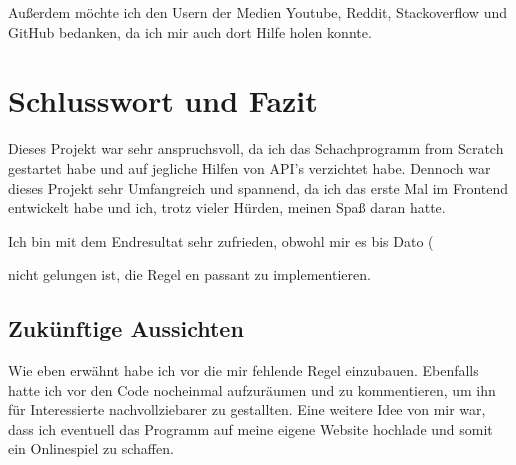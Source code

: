 \documentclass[a4paper, 10pt]{scrartcl}
\begin{document}
Außerdem möchte ich den Usern der Medien Youtube, Reddit, Stackoverflow und GitHub bedanken,
da ich mir auch dort Hilfe holen konnte. 

\section{Schlusswort und Fazit}
Dieses Projekt war sehr anspruchsvoll, da ich das Schachprogramm \glqq from Scratch\grqq{}
gestartet habe und auf jegliche Hilfen von API's verzichtet habe. Dennoch war dieses Projekt
sehr Umfangreich und spannend, da ich das erste Mal im Frontend entwickelt habe und ich,
trotz vieler Hürden, meinen Spaß daran hatte. 

Ich bin mit dem Endresultat sehr zufrieden, obwohl mir es bis Dato  (\date) 
nicht gelungen ist, die Regel \glqq en passant \grqq{} zu implementieren.

\subsection{Zukünftige Aussichten}
Wie eben erwähnt habe ich vor die mir fehlende Regel einzubauen. Ebenfalls hatte ich vor
den Code nocheinmal aufzuräumen und zu kommentieren, um ihn für Interessierte nachvollziebarer
zu gestallten. 
Eine weitere Idee von mir war, dass ich eventuell das Programm auf meine eigene Website
hochlade und somit ein Onlinespiel zu schaffen.
\end{document}
